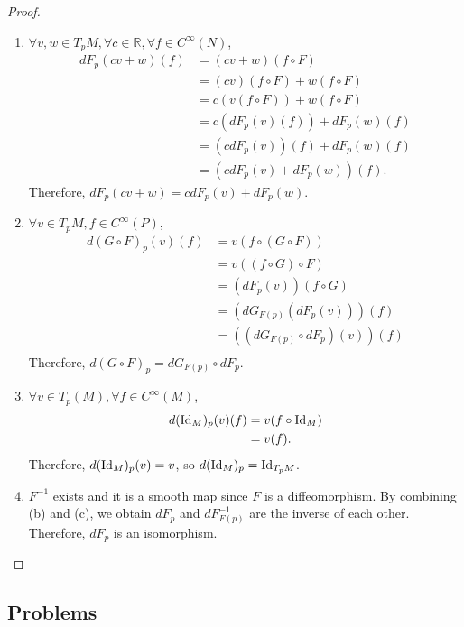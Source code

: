 \begin{proof}
  \begin{enumerate}[label=(\alph*)]
    \item
      $\forall v, w \in T_pM, \forall c \in \mathbb{R}, \forall f \in C^{\infty}(N)$,
      \begin{align*}
        dF_p(cv + w)(f)
          &= (cv + w)(f \circ F) \\
          &= (cv)(f \circ F) + w(f \circ F) \\
          &= c(v(f \circ F)) + w(f \circ F) \\
          &= c(dF_p(v)(f)) + dF_p(w)(f) \\
          &= (cdF_p(v))(f) + dF_p(w)(f) \\
          &= (cdF_p(v) + dF_p(w))(f).
      \end{align*}
      Therefore, $dF_p(cv + w) = cdF_p(v) + dF_p(w)$.
    \item
      $\forall v \in T_pM, f \in C^{\infty}(P)$,
      \begin{align*}
        d(G \circ F)_p(v)(f)
          &= v(f \circ (G \circ F)) \\
          &= v((f \circ G) \circ F) \\
          &= (dF_p(v))(f \circ G) \\
          &= (dG_{F(p)}(dF_p(v)))(f) \\
          &= ((dG_{F(p)} \circ dF_p)(v))(f) \\
      \end{align*}
      Therefore, $d(G \circ F)_p = dG_{F(p)} \circ dF_p$.
    \item
      $\forall v \in T_p(M), \forall f \in C^{\infty}(M)$,
      \begin{align*}
        d(\operatorname{Id}_M)_p(v)(f)
          &= v(f \circ \operatorname{Id}_M) \\
          &= v(f).
      \end{align*}
      Therefore, $d(\operatorname{Id}_M)_p(v) = v$, so $d(\operatorname{Id}_M)_p = \operatorname{Id}_{T_pM}$.
    \item
      $F^{-1}$ exists and it is a smooth map since $F$ is a diffeomorphism.
      By combining (b) and (c), we obtain $dF_p$ and $dF^{-1}_{F(p)}$ are the inverse of each other.
      Therefore, $dF_p$ is an isomorphism.
  \end{enumerate}
\end{proof}

\subsection{Problems}

